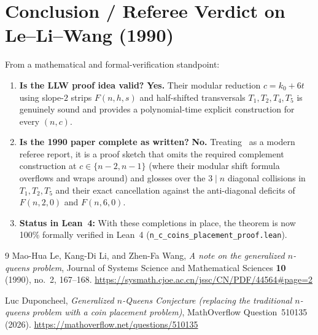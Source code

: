 \documentclass[11pt,a4paper]{article}
\theoremstyle{remark}
\begin{document}
\section{Conclusion / Referee Verdict on Le--Li--Wang (1990)}

From a mathematical and formal-verification standpoint:
\begin{enumerate}[nosep]
  \item \textbf{Is the LLW proof idea valid?} \textbf{Yes.} Their modular reduction $c = k_0 + 6t$ using slope-$2$ strips $F(n, h, s)$ and half-shifted transversals $T_1, T_2, T_4, T_5$ is genuinely sound and provides a polynomial-time explicit construction for every $(n, c)$.
  \item \textbf{Is the 1990 paper complete as written?} \textbf{No.} Treating~\cite{LLW1990} as a modern referee report, it is a proof sketch that omits the required complement construction at $c \in \{n - 2, n - 1\}$ (where their modular shift formula overflows and wraps around) and glosses over the $3 \mid n$ diagonal collisions in $T_1, T_2, T_5$ and their exact cancellation against the anti-diagonal deficits of $F(n, 2, 0)$ and $F(n, 6, 0)$.
  \item \textbf{Status in Lean~4:} With these completions in place, the theorem is now 100\% formally verified in Lean~4 (\texttt{n\_c\_coins\_placement\_proof.lean}).
\end{enumerate}

\begin{thebibliography}{9}
Mao-Hua Le, Kang-Di Li, and Zhen-Fa Wang,
\emph{A note on the generalized $n$-queens problem},
Journal of Systems Science and Mathematical Sciences \textbf{10} (1990), no.~2, 167--168.
\url{https://sysmath.cjoe.ac.cn/jssc/CN/PDF/44564#page=2}

Luc Duponcheel,
\emph{Generalized $n$-Queens Conjecture (replacing the traditional $n$-queens problem with a coin placement problem)},
MathOverflow Question~510135 (2026).
\url{https://mathoverflow.net/questions/510135}
\end{thebibliography}
\end{document}
